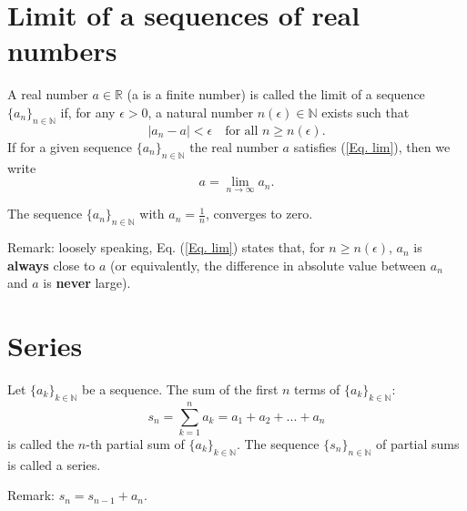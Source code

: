 \documentclass[notes=show,smaller,handout]{beamer}\usepackage[]{graphicx}\usepackage[]{color}
\begin{document}
\section{Limit of a sequences of real numbers }


\begin{frame}{\secname}



\begin{definition}
A real number  $a\in \mathbb{R}$ (a is a finite number) is called the limit of a sequence $\{a_n \}_{n \in \mathbb{N}}$ if, for any $\epsilon >0$, a natural number $n(\epsilon) \in \mathbb{N}$ exists such that
\begin{equation} \label{Eq. lim}
\vert a_{n}-a \vert < \epsilon \quad  \text{for all \ \ } n\geq n(\epsilon).
\end{equation}
If for a given sequence $\{a_n \}_{n \in \mathbb{N}}$ the real number $a$ satisfies (\ref{Eq. lim}), then we write
$$
a = \lim_{n\to \infty} a_n.
$$
\end{definition}

\begin{example}
The sequence $\{ a_n \}_{n \in \mathbb{N}}$
with $a_n = \frac{1}{n}$, converges to zero.
\end{example}

Remark: loosely speaking,  Eq. (\ref{Eq. lim}) states that, for $n \geq n(\epsilon)$, $a_n$ is \textbf{always} close to $a$ (or equivalently, the difference in absolute value between $a_n$ and $a$ is \textbf{never} large).

\end{frame}%


\section{Series}

\begin{frame}{\secname}

\begin{definition}
Let $\{ a_k \}_{k \in \mathbb{N}}$ be a  sequence. The sum of the first $n$ terms of  $\{ a_k \}_{k \in \mathbb{N}}$:
$$
s_n = \sum_{k=1}^{n} a_k = a_1 + a_2 +...+a_n
$$
is called the $n$-th partial sum of $\{ a_k \}_{k \in \mathbb{N}}$. The sequence $\{s_n\}_{n \in \mathbb{N}}$ of partial sums
is called a series.

\end{definition}

\vspace{0.4cm}

Remark: $s_n = s_{n-1} + a_n$.


\end{frame}%
\end{document}

